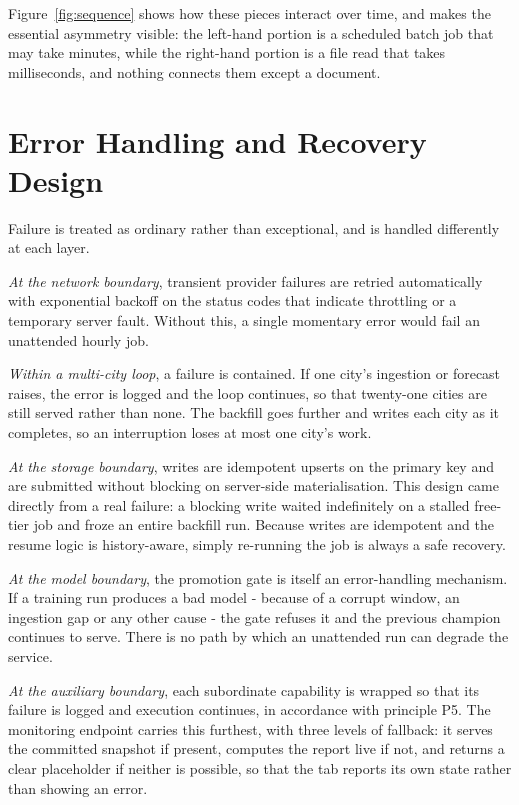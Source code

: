 Figure~\ref{fig:sequence} shows how these pieces interact over time, and makes
the essential asymmetry visible: the left-hand portion is a scheduled batch job
that may take minutes, while the right-hand portion is a file read that takes
milliseconds, and nothing connects them except a document.


\section{Error Handling and Recovery Design}
Failure is treated as ordinary rather than exceptional, and is handled
differently at each layer.

\emph{At the network boundary}, transient provider failures are retried
automatically with exponential backoff on the status codes that indicate
throttling or a temporary server fault. Without this, a single momentary error
would fail an unattended hourly job.

\emph{Within a multi-city loop}, a failure is contained. If one city's ingestion
or forecast raises, the error is logged and the loop continues, so that
twenty-one cities are still served rather than none. The backfill goes further
and writes each city as it completes, so an interruption loses at most one city's
work.

\emph{At the storage boundary}, writes are idempotent upserts on the primary key
and are submitted without blocking on server-side materialisation. This design
came directly from a real failure: a blocking write waited indefinitely on a
stalled free-tier job and froze an entire backfill run. Because writes are
idempotent and the resume logic is history-aware, simply re-running the job is
always a safe recovery.

\emph{At the model boundary}, the promotion gate is itself an error-handling
mechanism. If a training run produces a bad model - because of a corrupt window,
an ingestion gap or any other cause - the gate refuses it and the previous
champion continues to serve. There is no path by which an unattended run can
degrade the service.

\emph{At the auxiliary boundary}, each subordinate capability is wrapped so that
its failure is logged and execution continues, in accordance with principle P5.
The monitoring endpoint carries this furthest, with three levels of fallback: it
serves the committed snapshot if present, computes the report live if not, and
returns a clear placeholder if neither is possible, so that the tab reports its
own state rather than showing an error.

